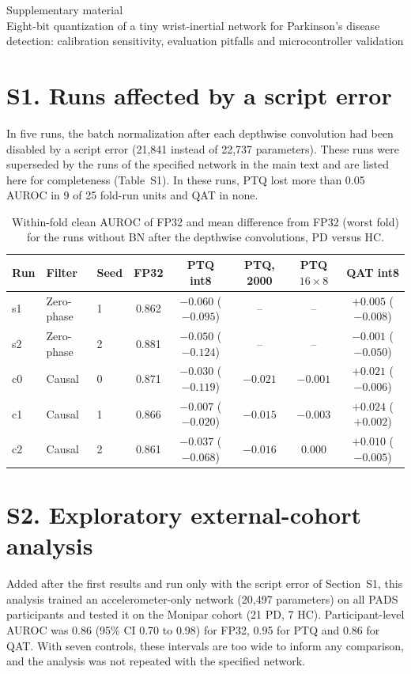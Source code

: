 \documentclass[preprint,12pt]{elsarticle}
\begin{document}
\begin{center}{\Large Supplementary material}\\[4pt]
Eight-bit quantization of a tiny wrist-inertial network for Parkinson's disease detection: calibration sensitivity, evaluation pitfalls and microcontroller validation\end{center}

\section*{S1. Runs affected by a script error}
In five runs, the batch normalization after each depthwise convolution had been disabled by a script error (21,841 instead of 22,737 parameters). These runs were superseded by the runs of the specified network in the main text and are listed here for completeness (Table~S1). In these runs, PTQ lost more than 0.05 AUROC in 9 of 25 fold-run units and QAT in none.

\begin{table}[h]
\caption{Within-fold clean AUROC of FP32 and mean difference from FP32 (worst fold) for the runs without BN after the depthwise convolutions, PD versus HC.}
\centering\scriptsize\setlength{\tabcolsep}{2pt}
\begin{tabular}{@{}lllccccc@{}}
\toprule
Run & Filter & Seed & FP32 & PTQ int8 & PTQ, 2000 & PTQ $16\times8$ & QAT int8 \\
\midrule
s1 & Zero-phase & 1 & 0.862 & $-0.060$ ($-0.095$) & -- & -- & $+0.005$ ($-0.008$) \\
s2 & Zero-phase & 2 & 0.881 & $-0.050$ ($-0.124$) & -- & -- & $-0.001$ ($-0.050$) \\
c0 & Causal & 0 & 0.871 & $-0.030$ ($-0.119$) & $-0.021$ & $-0.001$ & $+0.021$ ($-0.006$) \\
c1 & Causal & 1 & 0.866 & $-0.007$ ($-0.020$) & $-0.015$ & $-0.003$ & $+0.024$ ($+0.002$) \\
c2 & Causal & 2 & 0.861 & $-0.037$ ($-0.068$) & $-0.016$ & $0.000$ & $+0.010$ ($-0.005$) \\
\bottomrule
\end{tabular}
\end{table}

\section*{S2. Exploratory external-cohort analysis}
Added after the first results and run only with the script error of Section~S1, this analysis trained an accelerometer-only network (20,497 parameters) on all PADS participants and tested it on the Monipar cohort (21 PD, 7 HC). Participant-level AUROC was 0.86 (95\% CI 0.70 to 0.98) for FP32, 0.95 for PTQ and 0.86 for QAT. With seven controls, these intervals are too wide to inform any comparison, and the analysis was not repeated with the specified network.
\end{document}
